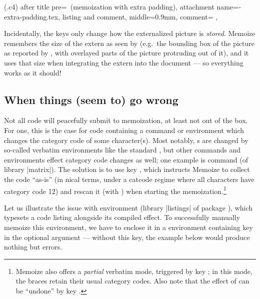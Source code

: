 \documentclass[a4paper,11pt]{article}
\begin{document}
(.c4){
  after title pre={\ (memoization with extra padding)},
  attachment name=\examplename-extra-padding.tex,
  listing and comment,
  middle=0.9mm,
  comment={\centering
  },
}

\enlargethispage{1ex} %
Incidentally, the  keys only change how
the externalized picture is \emph{stored}.  Memoize remembers the size of the
extern as seen by  (e.g.\ the bounding box of the picture as
reported by \TikZ, with overlayed parts of the picture protruding out of it),
and it uses that size when integrating the extern into the document --- so
everything works as it should!



\subsection{When things (seem to) go wrong}
\label{sec:tut:verbatim}

Not all code will peacefully submit to memoization, at least not out of the
box.  For one, this is the case for code containing a command or environment
which changes the category code of some character(s).  Most notably,
s are changed by so-called verbatim environments like the
standard  , but other commands and environments
effect category code changes as well; one example is command  (of
\TikZ{} library |matrix|).  The solution is to use key
, which instructs Memoize to collect the code ``as-is''
(in nical terms, under a catcode regime where all characters have
category code 12) and rescan it (with ) when starting the
memoization.\footnote{Memoize also offers a \emph{partial} verbatim mode,
  triggered by key ; in this mode, the braces retain their usual
  category codes.  Also note that the effect of  can be
  ``undone'' by key .}

Let us illustrate the issue with environment  (library
|listings| of package ), which typesets a code listing alongside
its compiled effect.  To successfully manually memoize this environment, we
have to enclose it in a  environment containing key
 in the optional argument --- without
this key, the example below would produce nothing but errors.

\end{document}
